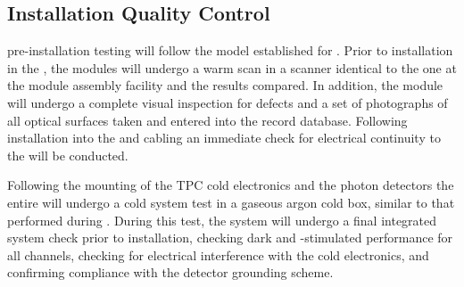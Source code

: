 \subsection{Installation Quality Control}
\label{sec:fdsp-pd-installqc}

 pre-installation testing will follow the model established for .  Prior to installation in the , the  modules will undergo a warm scan in a scanner identical to the one at the  module assembly facility and the results compared.  In addition, the module will undergo a complete visual inspection for defects and a set of photographs of all optical surfaces taken and entered into the  record database.  Following installation into the  and cabling an immediate check for electrical continuity to the  will be conducted.

Following the mounting of the TPC cold electronics and the photon detectors the entire  will undergo a cold system test in a gaseous argon cold box, similar to that performed during .  During this test, the  system will undergo a final integrated system check prior to installation, checking dark and -stimulated  performance for all channels, checking for electrical interference with the cold electronics, and confirming compliance with the detector grounding scheme.